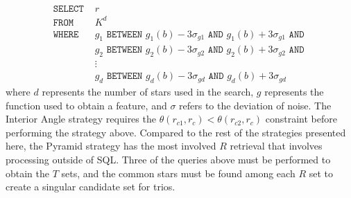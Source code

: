 \small \noindent
\begin{align*}
    \texttt{SELECT } &r \\
    \texttt{FROM } &K^d \\
    \texttt{WHERE } &g_1 \texttt{ BETWEEN } g_1(b) - 3\sigma_{g1} \texttt{ AND } g_1(b) + 3\sigma_{g1} \texttt{ AND } \\
                    &g_2 \texttt{ BETWEEN } g_2(b) - 3\sigma_{g2} \texttt{ AND } g_2(b) + 3\sigma_{g2} \texttt{ AND } \\
                    &\vdots \\
                    &g_d \texttt{ BETWEEN } g_d(b) - 3\sigma_{gd} \texttt{ AND } g_d(b) + 3\sigma_{gd}
\end{align*}
\normalsize
where $d$ represents the number of stars used in the search, $g$ represents the function used to obtain a feature,
and $\sigma$ refers to the deviation of noise.
The Interior Angle strategy requires the $\theta(r_{c1}, r_{c})\!<\!\theta(r_{c2}, r_c)$ constraint before performing
the strategy above.
Compared to the rest of the strategies presented here, the Pyramid strategy has the most involved $R$ retrieval that
involves processing outside of SQL\@.
Three of the queries above must be performed to obtain the $T$ sets, and the common stars must be
found among each $R$ set to create a singular candidate set for trios.

